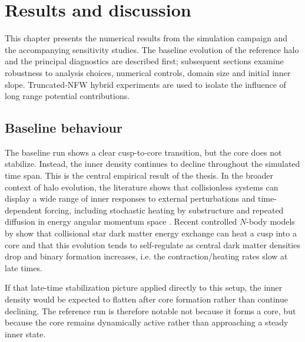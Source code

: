 \chapter{Results and discussion}

This chapter presents the numerical results from the simulation campaign and the accompanying sensitivity studies. The baseline evolution of the reference halo and the principal diagnostics are described first; subsequent sections examine robustness to analysis choices, numerical controls, domain size and initial inner slope. Truncated‑NFW hybrid experiments are used to isolate the influence of long range potential contributions.

\section{Baseline behaviour}
\label{sec:results_baseline}

The baseline run shows a clear cusp-to-core transition, but the core does not stabilize. Instead, the inner density continues to decline throughout the simulated time span. This is the central empirical result of the thesis. In the broader context of halo evolution, the literature shows that collisionless systems can display a wide range of inner responses to external perturbations and time-dependent forcing, including stochastic heating by substructure and repeated diffusion in energy angular momentum space \citep{penarrubia2017fluctuations,penarrubia2019stochastic}. Recent controlled $N$-body models by \cite{errani2026collisional} show that collisional star dark matter energy exchange can heat a cusp into a core and that this evolution tends to self-regulate as central dark matter densities drop and binary formation increases, i.e. the contraction/heating rates slow at late times.

If that late-time stabilization picture applied directly to this setup, the inner density would be expected to flatten after core formation rather than continue declining. The reference run is therefore notable not because it forms a core, but because the core remains dynamically active rather than approaching a steady inner state.


